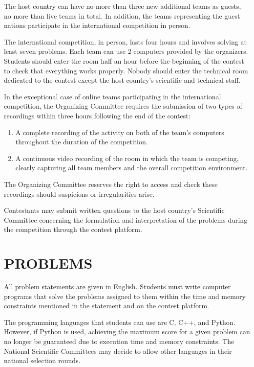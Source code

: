 \documentclass{article}
\begin{document}
The host country can have no more than three new additional teams as guests, no more than five teams in total. In addition, the teams representing the guest nations participate in the international competition in person. 

The international competition, in person, lasts four hours and involves solving at least seven problems. Each team can use 2 computers provided by the organizers. Students should enter the room half an hour before the beginning of the contest to check that everything works properly. Nobody should enter the technical room dedicated to the contest except the host country's scientific and technical staff. 

In the exceptional case of online teams participating in the international competition, the Organizing Committee requires the submission of two types of recordings within three hours following the end of the contest:
\begin{enumerate}
\item A complete recording of the activity on both of the team's computers throughout the duration of the competition.
\item A continuous video recording of the room in which the team is competing, clearly capturing all team members and the overall competition environment.
\end{enumerate}
The Organizing Committee reserves the right to access and check these recordings should suspicions or irregularities arise.

Contestants may submit written questions to the host country's Scientific Committee concerning the formulation and interpretation of the problems during the competition through the contest platform. 

\section{PROBLEMS} 

All problem statements are given in English. Students must write computer programs that solve the problems assigned to them within the time and memory constraints mentioned in the statement and on the contest platform.

The programming languages that students can use are C, C++, and Python. However, if Python is used, achieving the maximum score for a given problem can no longer be guaranteed due to execution time and memory constraints. The National Scientific Committees may decide to allow other languages in their national selection rounds. 
\end{document}
